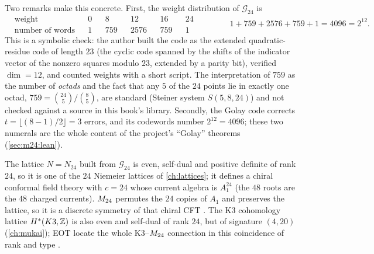 Two remarks make this concrete. First, the weight distribution of $\mathcal G_{24}$ is
\begin{equation}\label{eq:m24:weights}
\begin{aligned}
 &\text{weight}&&0&&8&&12&&16&&24\\
 &\text{number of words}&&1&&759&&2576&&759&&1
\end{aligned}
\qquad\qquad 1+759+2576+759+1=4096=2^{12}.
\end{equation}
This is a symbolic check: the author built the code as the extended quadratic-residue code
of length $23$ (the cyclic code spanned by the shifts of the indicator vector of the
nonzero squares modulo $23$, extended by a parity bit), verified $\dim=12$, and counted
weights with a short script. The interpretation of $759$ as the number of \emph{octads} and
the fact that any $5$ of the $24$ points lie in exactly one octad, $759=\binom{24}5/\binom85$,
are standard (Steiner system $S(5,8,24)$) and not checked against a
source in this book's library. Secondly, the Golay code corrects $t=\lfloor(8-1)/2\rfloor=3$ errors, and its
codewords number $2^{12}=4096$; these two numerals are the whole content of the project's
``Golay'' theorems (\cref{sec:m24:lean}).

\begin{physicsbox}
The lattice $N=N_{24}$ built from $\mathcal G_{24}$ is even, self-dual and positive
definite of rank $24$, so it is one of the $24$ Niemeier lattices of
\cref{ch:lattices};
it defines a chiral conformal field theory with $c=24$ whose current algebra is
$A_1^{24}$ (the $48$ roots are the $48$ charged currents). $M_{24}$ permutes the $24$ copies
of $A_1$ and preserves the lattice, so it is a discrete symmetry of that chiral CFT
. The K3 cohomology lattice $H^*(K3,\mathbb{Z})$ is also even
and self-dual of rank $24$, but of signature $(4,20)$ (\cref{ch:mukai}); EOT locate the
whole K3--$M_{24}$ connection in this coincidence of rank and type .
\end{physicsbox}

